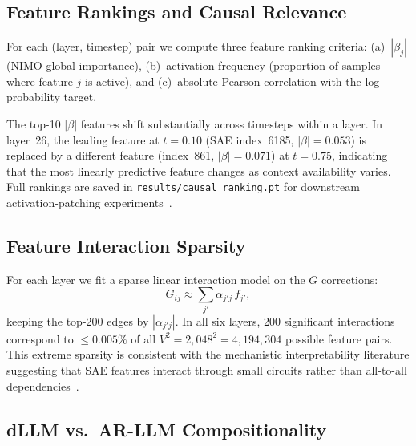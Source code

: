 \documentclass{article}
\begin{document}
\subsection{Feature Rankings and Causal Relevance}

For each (layer, timestep) pair we compute three feature ranking criteria: (a)~$|\beta_j|$ (NIMO global importance), (b)~activation frequency (proportion of samples where feature $j$ is active), and (c)~absolute Pearson correlation with the log-probability target.

The top-10 $|\beta|$ features shift substantially across timesteps within a layer. In layer~26, the leading feature at $t = 0.10$ (SAE index~6185, $|\beta| = 0.053$) is replaced by a different feature (index~861, $|\beta| = 0.071$) at $t = 0.75$, indicating that the most linearly predictive feature changes as context availability varies. Full rankings are saved in \texttt{results/causal\_ranking.pt} for downstream activation-patching experiments~\citep{meng2022locating}.

\subsection{Feature Interaction Sparsity}

For each layer we fit a sparse linear interaction model on the $G$ corrections:
\begin{equation}
    G_{ij} \approx \sum_{j'} \alpha_{j'j}\,f_{j'},
\end{equation}
keeping the top-200 edges by $|\alpha_{j'j}|$.
In all six layers, 200 significant interactions correspond to $\le 0.005\%$ of all $V^2 = 2{,}048^2 = 4{,}194{,}304$ possible feature pairs.
This extreme sparsity is consistent with the mechanistic interpretability literature suggesting that SAE features interact through small circuits rather than all-to-all dependencies~\citep{elhage2021mathematical,conmy2023towards}.

\subsection{dLLM vs.\ AR-LLM Compositionality}
\end{document}
